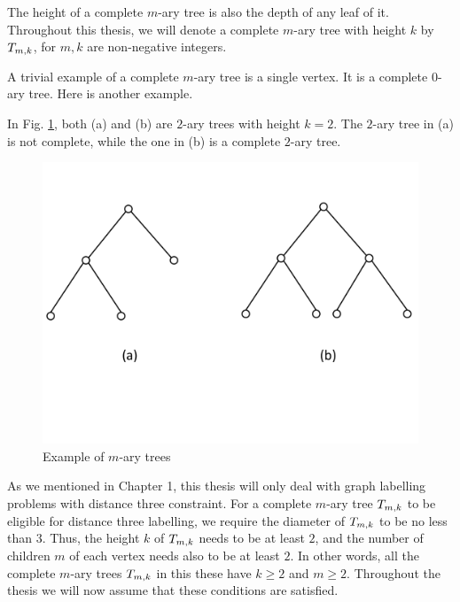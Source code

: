 The height of a complete $m$-ary tree is also the depth of any leaf of it.  Throughout this thesis, we will denote a complete $m$-ary tree with height $k$ by $T_{m,k}$, for $m, k$ are non-negative integers. 

A trivial example of a complete $m$-ary tree is a single vertex. It is a complete $0$-ary tree. Here is another example. 
\begin{example}
In Fig. \ref{example of m-ary tree}, both (a) and (b) are $2$-ary trees with height $k = 2$. The $2$-ary tree in (a) is not complete, while the one in (b) is a complete $2$-ary tree. 

\begin{figure}
\centering
      \vspace{-15pt}
    \includegraphics[scale=0.4]{../figures/fig2-4.pdf}
        \vspace{-50pt}
\caption{Example of $m$-ary trees}
\label{example of m-ary tree}
\end{figure}

\end{example}

As we mentioned in Chapter 1, this thesis will only deal with graph labelling problems with distance three constraint. For a complete $m$-ary tree $T_{m,k}$ to be eligible for distance three labelling, we require the diameter of $T_{m,k}$ to be no less than $3$. Thus, the height $k$ of $T_{m,k}$ needs to be at least $2$, and the number of children $m$ of each vertex needs also to be at least $2$. In other words, all the complete $m$-ary trees $T_{m,k}$ in this these have $k \ge 2$ and $m \ge 2$. Throughout the thesis we will now assume that these conditions are satisfied. 

